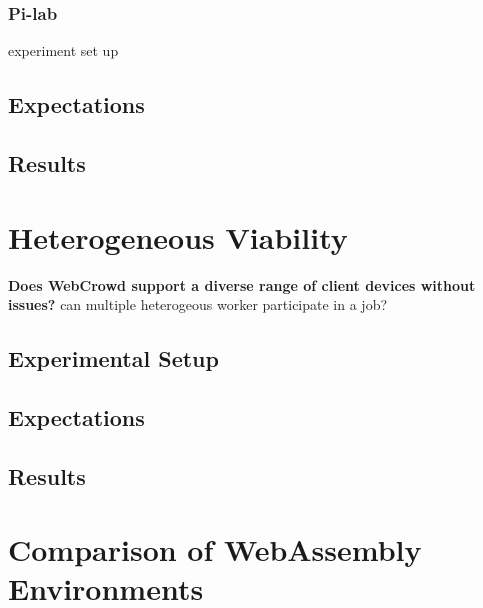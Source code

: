 \subsubsection{Pi-lab}
experiment set up

\subsection{Expectations}

\subsection{Results}

\section{Heterogeneous Viability}
\label{sec:evaluation:heterogen}
\textbf{Does WebCrowd support a diverse range of client devices without issues?}
\newline
can multiple heterogeous worker participate in a job?

\subsection{Experimental Setup}

\subsection{Expectations}

\subsection{Results}

\section{Comparison of WebAssembly Environments}
\label{sec:evaluation:languages}